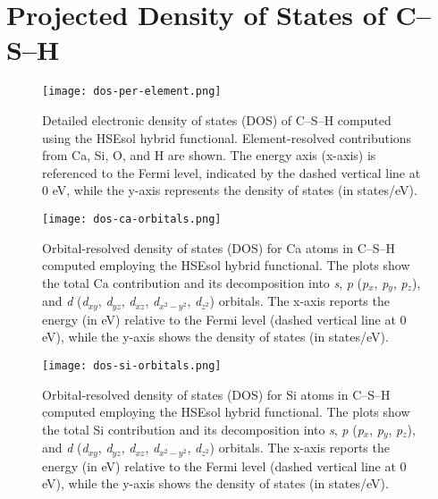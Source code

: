 \appendix
\chapter{Projected Density of States of C--S--H} %
\label{AppendixA} %


\begin{figure}[h]
    \centering
    \texttt{[image: dos-per-element.png]}
    \caption{
        Detailed electronic density of states (DOS) of C--S--H computed using the HSEsol hybrid functional. Element-resolved contributions from Ca, Si, O, and H are shown. The energy axis (x-axis) is referenced to the Fermi level, indicated by the dashed vertical line at 0 eV, while the y-axis represents the density of states (in states/eV).}
    \label{fig:pdos-all}
\end{figure}

\begin{figure}[h]
    \centering
    \texttt{[image: dos-ca-orbitals.png]}
    \caption{Orbital-resolved density of states (DOS) for Ca atoms in C--S--H computed employing the HSEsol hybrid functional. The plots show the total Ca contribution and its decomposition into \textit{s}, \textit{p} (\textit{p}$_x$, \textit{p}$_y$, \textit{p}$_z$), and \textit{d} (\textit{d}$_{xy}$, \textit{d}$_{yz}$, \textit{d}$_{xz}$, \textit{d}$_{x^2-y^2}$, \textit{d}$_{z^2}$) orbitals. The x-axis reports the energy (in eV) relative to the Fermi level (dashed vertical line at 0 eV), while the y-axis shows the density of states (in states/eV).}
    \label{fig:pdos-ca}
\end{figure}

\begin{figure}[h]
    \centering
    \texttt{[image: dos-si-orbitals.png]}
    \caption{Orbital-resolved density of states (DOS) for Si atoms in C--S--H computed employing the HSEsol hybrid functional. The plots show the total Si contribution and its decomposition into \textit{s}, \textit{p} (\textit{p}$_x$, \textit{p}$_y$, \textit{p}$_z$), and \textit{d} (\textit{d}$_{xy}$, \textit{d}$_{yz}$, \textit{d}$_{xz}$, \textit{d}$_{x^2-y^2}$, \textit{d}$_{z^2}$) orbitals. The x-axis reports the energy (in eV) relative to the Fermi level (dashed vertical line at 0 eV), while the y-axis shows the density of states (in states/eV).}
    \label{fig:pdos-si}
\end{figure}

